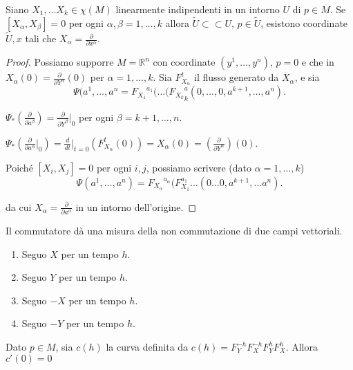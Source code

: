 \begin{proposition}
 Siano $X_1,\dots X_k\in \chi(M)$ linearmente indipendenti in un intorno $U$ di $p\in M$. Se $[X_\alpha,X_\beta]=0$ per ogni $\alpha,\beta=1,\dots ,k$ allora $\tilde{U}\subset\subset U$, $p\in \tilde{U}$, esistono coordinate $\tilde{U},x$ tali che $X_\alpha=\frac{\partial}{\partial x^{\alpha}}$.
\end{proposition}

\begin{proof}
 Possiamo supporre $M=\mathbb{R}^n$ con coordinate $(y^1,\dots, y^n)$, $p=0$ e che in $X_\alpha(0)=\frac{\partial}{\partial Y^\alpha}(0)$ per $\alpha=1,\dots, k$. Sia $F_{X_\alpha}^t$ il flusso generato da $X_\alpha$, e sia 
 \[\Psi(a^1,\dots, a^n={F_{X_1}}^{a_1}(\dots ({F_{X_k}}^a_k(0,\dots,0,a^{k+1},\dots, a^n).\]
 
 $\Psi_*(\frac{\partial}{\partial a^{\beta}})=\frac{\partial}{\partial Y^\beta}|_0$ per ogni $\beta=k+1,\dots,n$.
 
 $\Psi_*\left(\frac{\partial}{\partial a^\alpha}|_0\right)=\frac{d}{dt}|_{t=0}\left(F_{X_\alpha}^t(0)\right)=X_\alpha(0)=\left(\frac{\partial}{\partial Y^{\alpha}}\right)(0)$.
 
 Poiché $[X_i,X_j]=0$ per ogni $i,j$, possiamo scrivere (dato $\alpha=1,\dots, k$)
 \[\Psi(a^1,\dots,a^n)={F_{X_\alpha}}^{a_\alpha}(F^{a_1}_{X_1}\dots (0\dots 0, a^{k+1},\dots a^n).\]
 
 da cui $X_{\alpha}=\frac{\partial}{\partial a^{\alpha}}$ in un intorno dell'origine.
\end{proof}

Il commutatore dà una misura della non commutazione di due campi vettoriali.
\begin{enumerate}
 \item Seguo $X$ per un tempo $h$.
 \item Seguo $Y$ per un tempo $h$.
 \item Seguo $-X$ per un tempo $h$.
 \item Seguo $-Y$ per un tempo $h$.
\end{enumerate}


\begin{proposition}
 Dato $p\in M$, sia $c(h)$ la curva definita da $c(h)=F_Y^{-h}F_X^{-h}F_Y^hF_X^h$. Allora $c'(0)=0$
\end{proposition}

